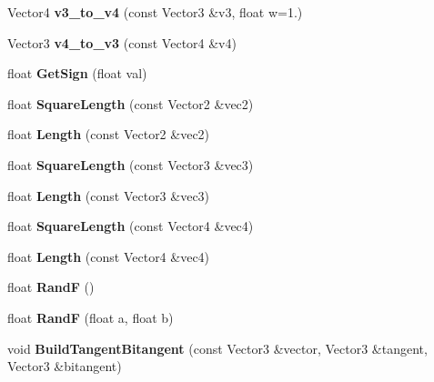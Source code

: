 \begin{DoxyCompactItemize}
Vector4 {\bfseries v3\+\_\+to\+\_\+v4} (const Vector3 \&v3, float w=1.)
\item 
\mbox{\label{namespaceMathUtil_a456cbe03beb8b4cb74c00da0672c9907}} 
Vector3 {\bfseries v4\+\_\+to\+\_\+v3} (const Vector4 \&v4)
\item 
\mbox{\label{namespaceMathUtil_abddda875766cfd0e5d5a1def0e37cfde}} 
float {\bfseries Get\+Sign} (float val)
\item 
\mbox{\label{namespaceMathUtil_ab8d3d918034fe0e5dd1cd328bc0efe2d}} 
float {\bfseries Square\+Length} (const Vector2 \&vec2)
\item 
\mbox{\label{namespaceMathUtil_ae9f35b16298278dbf26052295b59c3a1}} 
float {\bfseries Length} (const Vector2 \&vec2)
\item 
\mbox{\label{namespaceMathUtil_a8a7197e9559a243aee16ebff4d86eed4}} 
float {\bfseries Square\+Length} (const Vector3 \&vec3)
\item 
\mbox{\label{namespaceMathUtil_a9b64265d155d634c84b8f1918f6e4449}} 
float {\bfseries Length} (const Vector3 \&vec3)
\item 
\mbox{\label{namespaceMathUtil_aac2941dd4c47ceeb2e1dfc6177c00209}} 
float {\bfseries Square\+Length} (const Vector4 \&vec4)
\item 
\mbox{\label{namespaceMathUtil_a171f640e02eefb587934fd13dae9be2f}} 
float {\bfseries Length} (const Vector4 \&vec4)
\item 
\mbox{\label{namespaceMathUtil_a43b348cc14a31eae1e79fb1abf57b71b}} 
float {\bfseries RandF} ()
\item 
\mbox{\label{namespaceMathUtil_a1e80fe559e9f4a0d72f15349cb37a7d7}} 
float {\bfseries RandF} (float a, float b)
\item 
\mbox{\label{namespaceMathUtil_a21a92d70cd3776ed7c07e9eee8bcab3f}} 
void {\bfseries Build\+Tangent\+Bitangent} (const Vector3 \&vector, Vector3 \&tangent, Vector3 \&bitangent)

\end{DoxyCompactItemize}
